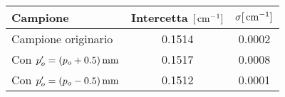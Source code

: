 \begin{tabulary}{\textwidth}{LCC}
\toprule
Campione & Intercetta $[\,\mathrm{cm}^{-1}]$  & $\sigma [\,\mathrm{cm}^{-1}]$\\ \midrule
Campione originario & 0.1514 & 0.0002\\ \midrule
Con $p_{o}'=(p_o+0.5)\,\mathrm{mm}$ & 0.1517 & 0.0008\\ \midrule
Con $p_{o}'=(p_o-0.5)\,\mathrm{mm}$ & 0.1512 & 0.0001\\
\bottomrule
\end{tabulary}
